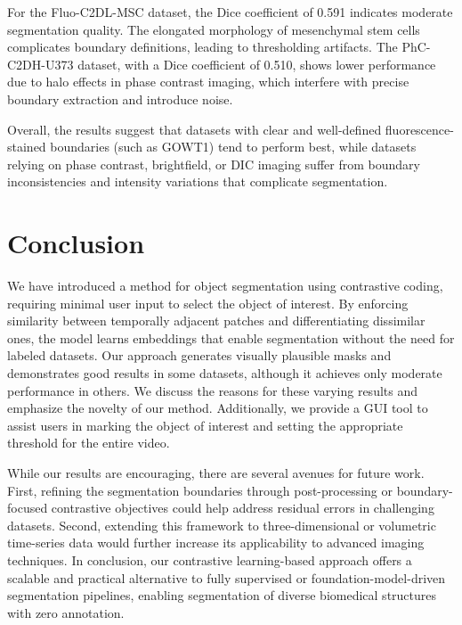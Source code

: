 \documentclass[./dissertation.tex]{subfiles}
\begin{document}
For the Fluo-C2DL-MSC dataset, the Dice coefficient of 0.591 indicates moderate segmentation quality. The elongated morphology of mesenchymal stem cells complicates boundary definitions, leading to thresholding artifacts. The PhC-C2DH-U373 dataset, with a Dice coefficient of 0.510, shows lower performance due to halo effects in phase contrast imaging, which interfere with precise boundary extraction and introduce noise.

Overall, the results suggest that datasets with clear and well-defined fluorescence-stained boundaries (such as GOWT1) tend to perform best, while datasets relying on phase contrast, brightfield, or DIC imaging suffer from boundary inconsistencies and intensity variations that complicate segmentation.


\label{Conclusion}
\section{Conclusion}

We have introduced a method for object segmentation using contrastive coding, requiring minimal user input to select the object of interest. By enforcing similarity between temporally adjacent patches and differentiating dissimilar ones, the model learns embeddings that enable segmentation without the need for labeled datasets. Our approach generates visually plausible masks and demonstrates good results in some datasets, although it achieves only moderate performance in others. We discuss the reasons for these varying results and emphasize the novelty of our method. Additionally, we provide a GUI tool to assist users in marking the object of interest and setting the appropriate threshold for the entire video.

While our results are encouraging, there are several avenues for future work. First, refining the segmentation boundaries through post-processing or boundary-focused contrastive objectives could help address residual errors in challenging datasets. Second, extending this framework to three-dimensional or volumetric time-series data would further increase its applicability to advanced imaging techniques. In conclusion, our contrastive learning-based approach offers a scalable and practical alternative to fully supervised or foundation-model-driven segmentation pipelines, enabling segmentation of diverse biomedical structures with zero annotation.
\end{document}
